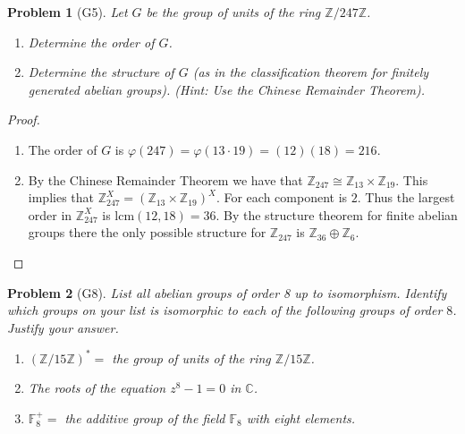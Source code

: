 \documentclass[10pt]{article}
\newcommand{\sk}{\vskip 10mm}
\newcommand{\bb}[1]{\mathbb{#1}}
\theoremstyle{plain}
\newtheorem{problem}{Problem}
\theoremstyle{remark}
\begin{document}
\sk


\begin{problem}[G5]
  Let $G$ be the group of units of the ring $\bb{Z}/247\bb{Z}$.
  \begin{enumerate}
  \item Determine the order of $G$.
  \item Determine the structure of $G$ (as in the classification theorem for
    finitely generated abelian groups).
    (Hint: Use the Chinese Remainder Theorem).
  \end{enumerate}
\end{problem}

\begin{proof}
  \begin{enumerate}
  \item The order of $G$ is $\varphi(247)=\varphi(13\cdot 19)=(12)(18)=216$.
  \item By the Chinese Remainder Theorem we have that $\bb{Z}_{247}\cong\bb{Z}_{13}\times\bb{Z}_{19}$.
    This implies that $\bb{Z}_{247}^X=(\bb{Z}_{13}\times\bb{Z}_{19})^X$. For each component is
    $2$. Thus the largest order in $\bb{Z}_{247}^X$ is $\text{lcm}(12,18)=36$. By the
    structure theorem for finite abelian groups there the only possible structure for
    $\bb{Z}_{247}$ is $\bb{Z}_{36}\oplus\bb{Z}_6$.
  \end{enumerate}
\end{proof}

\sk


\begin{problem}[G8]
  List all abelian groups of order 8 up to isomorphism. Identify which groups on
  your list is isomorphic to each of the following groups of order $8$. Justify
  your answer.
  \begin{enumerate}
  \item $(\bb{Z}/15\bb{Z})^*=$ the group of units of the ring $\bb{Z}/15\bb{Z}$.
  \item The roots of the equation $z^8-1=0$ in $\bb{C}$.
  \item $\bb{F}_8^+=$ the additive group of the field $\bb{F}_8$ with
    eight elements.
  \end{enumerate}
\end{problem}
\end{document}
